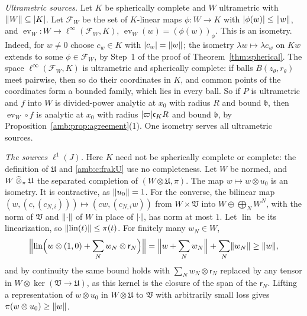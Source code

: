 \begin{remark}\label{amb:rem:one-space}
\emph{Ultrametric sources.} Let $K$ be spherically complete and $W$ ultrametric with $\lVert W\rVert\subseteq\lvert K\rvert$. Let $\mathcal F_W$ be the set of $K$-linear maps $\phi\colon W\to K$ with $\lvert \phi(w)\rvert\le\lVert w\rVert$, and $\operatorname{ev}_W\colon W\to\ell^\infty(\mathcal F_W,K)$, $\operatorname{ev}_W(w)=(\phi(w))_\phi$. This is an isometry. Indeed, for $w\ne0$ choose $c_w\in K$ with $\lvert c_w\rvert=\lVert w\rVert$; the isometry $\lambda w\mapsto\lambda c_w$ on $Kw$ extends to some $\phi\in\mathcal F_W$, by Step~1 of the proof of Theorem~\ref{thm:spherical}. The space $\ell^\infty(\mathcal F_W,K)$ is ultrametric and spherically complete: if balls $\overline B(z_\theta,r_\theta)$ meet pairwise, then so do their coordinates in $K$, and common points of the coordinates form a bounded family, which lies in every ball. So if $P$ is ultrametric and $f$ into $W$ is divided-power analytic at $x_0$ with radius $R$ and bound $\mathfrak b$, then $\operatorname{ev}_W\circ f$ is analytic at $x_0$ with radius $\lvert \varpi\rvert\mathfrak c_KR$ and bound $\mathfrak b$, by Proposition~\ref{amb:prop:agreement}(1). One isometry serves all ultrametric sources.

\emph{The sources $\ell^1(J)$.} Here $K$ need not be spherically complete or complete: the definition of $\mathfrak U$ and \eqref{amb:c:frakU} use no completeness. Let $W$ be normed, and $W\mathbin{\widehat\otimes}_\pi\mathfrak U$ the separated completion of $(W\otimes\mathfrak U,\pi)$. The map $w\mapsto w\otimes u_0$ is an isometry. It is contractive, as $\lVert u_0\rVert=1$. For the converse, the bilinear map $(w,(c,(c_{N,i})))\mapsto(cw,(c_{N,i}w))$ from $W\times\mathfrak V$ into $W\oplus\bigoplus_NW^N$, with the norm of $\mathfrak V$ and $\lVert \cdot\rVert$ of $W$ in place of $\lvert \cdot\rvert$, has norm at most $1$. Let $\operatorname{lin}$ be its linearization, so $\lVert \operatorname{lin}(t)\rVert\le\pi(t)$. For finitely many $w_N\in W$,
\[
 \Bigl\lVert\operatorname{lin}\Bigl(w\otimes(1,0)+\sum_Nw_N\otimes\mathsf r_N\Bigr)\Bigr\rVert=\Bigl\lVert w+\sum_Nw_N\Bigr\rVert+\sum_N\lVert w_N\rVert\ge\lVert w\rVert,
\]
and by continuity the same bound holds with $\sum_Nw_N\otimes\mathsf r_N$ replaced by any tensor in $W\otimes\ker(\mathfrak V\to\mathfrak U)$, as this kernel is the closure of the span of the $\mathsf r_N$. Lifting a representation of $w\otimes u_0$ in $W\otimes\mathfrak U$ to $\mathfrak V$ with arbitrarily small loss gives $\pi(w\otimes u_0)\ge\lVert w\rVert$.


\end{remark}
